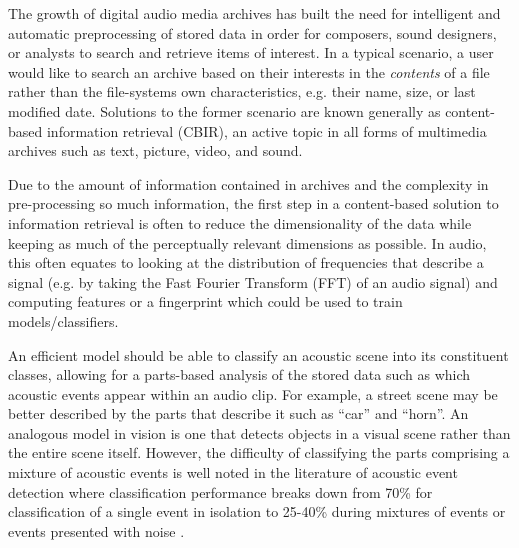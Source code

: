 \documentclass[a4paper,11pt,final]{ThesisStyle}
\begin{document}
The growth of digital audio media archives has built the need for intelligent and automatic preprocessing of stored data in order for composers, sound designers, or analysts to search and retrieve items of interest.  In a typical scenario, a user would like to search an archive based on their interests in the \textit{contents} of a file rather than the file-systems own characteristics, e.g. their name, size, or last modified date.  Solutions to the former scenario are known generally as content-based information retrieval (CBIR), an active topic in all forms of multimedia archives such as text, picture, video, and sound. 

Due to the amount of information contained in archives and the complexity in pre-processing so much information, the first step in a content-based solution to information retrieval is often to reduce the dimensionality of the data while keeping as much of the perceptually relevant dimensions as possible.  In audio, this often equates to looking at the distribution of frequencies that describe a signal (e.g. by taking the Fast Fourier Transform (FFT) of an audio signal) and computing features or a fingerprint which could be used to train models/classifiers.

An efficient model should be able to classify an acoustic scene into its constituent classes, allowing for a parts-based analysis of the stored data such as which acoustic events appear within an audio clip.  For example, a street scene may be better described by the parts that describe it such as ``car'' and ``horn''.  An analogous model in vision is one that detects objects in a visual scene rather than the entire scene itself.  However, the difficulty of classifying the parts comprising a mixture of acoustic events is well noted in the literature of acoustic event detection where classification performance breaks down from 70\% for classification of a single event in isolation to 25-40\% during mixtures of events or events presented with noise \cite{Temko2007}. 

\end{document}
